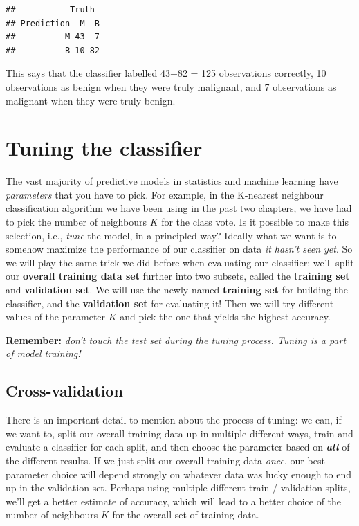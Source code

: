 \documentclass[
]{krantz}
\renewenvironment{quote}{\begin{VF}}{\end{VF}}
\begin{document}
\begin{verbatim}
##           Truth
## Prediction  M  B
##          M 43  7
##          B 10 82
\end{verbatim}

This says that the classifier labelled 43+82 = 125 observations correctly,
10 observations as benign when they were truly malignant,
and 7 observations as malignant when they were truly benign.

\hypertarget{tuning-the-classifier}{%
\section{Tuning the classifier}\label{tuning-the-classifier}}

The vast majority of predictive models in statistics and machine learning have
\emph{parameters} that you have to pick. For example, in the K-nearest neighbour
classification algorithm we have been using in the past two chapters, we have
had to pick the number of neighbours \(K\) for the class vote. Is it possible to
make this selection, i.e., \emph{tune} the model, in a principled way? Ideally what
we want is to somehow maximize the performance of our classifier on data \emph{it
hasn't seen yet}. So we will play the same trick we did before when evaluating
our classifier: we'll split our \textbf{overall training data set} further into two
subsets, called the \textbf{training set} and \textbf{validation set}. We will use the
newly-named \textbf{training set} for building the classifier, and the \textbf{validation
set} for evaluating it! Then we will try different values of the parameter \(K\)
and pick the one that yields the highest accuracy.

\begin{quote}
\textbf{Remember:} \emph{don't touch the test set during the tuning process. Tuning is a part of model training!}
\end{quote}

\hypertarget{cross-validation}{%
\subsection{Cross-validation}\label{cross-validation}}

There is an important detail to mention about the process of tuning: we can, if
we want to, split our overall training data up in multiple different ways,
train and evaluate a classifier for each split, and then choose the parameter
based on \textbf{\emph{all}} of the different results. If we just split our overall training
data \emph{once}, our best parameter choice will depend strongly on whatever data
was lucky enough to end up in the validation set. Perhaps using multiple
different train / validation splits, we'll get a better estimate of accuracy,
which will lead to a better choice of the number of neighbours \(K\) for the
overall set of training data.
\end{document}
